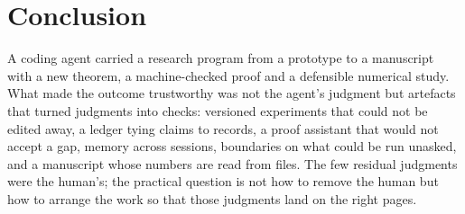 \section{Conclusion}
\label{sec:conclusion}

A coding agent carried a research program from a prototype to a manuscript with
a new theorem, a machine-checked proof and a defensible numerical study. What made the outcome
trustworthy was not the agent's judgment but artefacts that turned judgments into checks:
versioned experiments that could not be edited away, a ledger tying claims to records, a proof
assistant that would not accept a gap, memory across sessions, boundaries on what could be run
unasked, and a manuscript whose numbers are read from files. The few residual judgments were the
human's; the practical question is not how to remove the human but how to arrange the work so that
those judgments land on the right pages.
